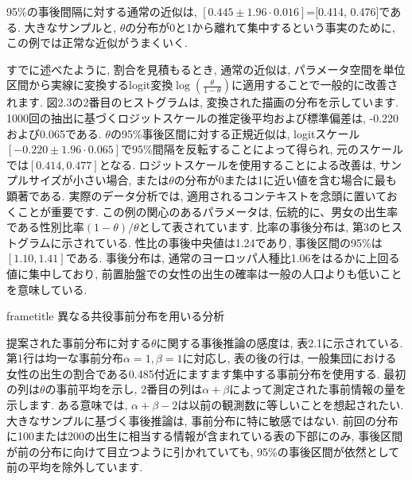 \documentclass[10pt,dvipdfmx,a4]{beamer}
\newcommand{\dbox}[1]{\begin{beamercolorbox}[wd=122mm, sep=0pt, shadow=false, rounded=false]{frametitle} { #1}\end{beamercolorbox}}
\begin{document}
\begin{frame}
95\%の事後間隔に対する通常の近似は, $[0.445\pm 1.96\cdot 0.016]$=[0.414, 0.476]である.
大きなサンプルと, $\theta$の分布が0と1から離れて集中するという事実のために, この例では正常な近似がうまくいく.

すでに述べたように, 割合を見積もるとき, 通常の近似は, パラメータ空間を単位区間から実線に変換するlogit変換$\log(\tfrac{\theta}{1-\theta})$に適用することで一般的に改善されます.
図2.3の2番目のヒストグラムは, 変換された描画の分布を示しています.
1000回の抽出に基づくロジットスケールの推定後平均および標準偏差は, -0.220および0.065である.
$\theta$の95\%事後区間に対する正規近似は, logitスケール$[-0.220\pm 1.96\cdot0.065]$で95\%間隔を反転することによって得られ, 元のスケールでは$[0.414,0.477]$となる.
ロジットスケールを使用することによる改善は, サンプルサイズが小さい場合, または$\theta$の分布が0または1に近い値を含む場合に最も顕著である.
実際のデータ分析では, 適用されるコンテキストを念頭に置いておくことが重要です.
この例の関心のあるパラメータは, 伝統的に、男女の出生率である性別比率$(1-\theta)/\theta$として表されています.
比率の事後分布は, 第3のヒストグラムに示されている.
性比の事後中央値は1.24であり, 事後区間の95\%は$[1.10,1.41]$である.
事後分布は, 通常のヨーロッパ人種比1.06をはるかに上回る値に集中しており, 前置胎盤での女性の出生の確率は一般の人口よりも低いことを意味している.
\end{frame}


\begin{frame}
\dbox{異なる共役事前分布を用いる分析}
提案された事前分布に対する$\theta$に関する事後推論の感度は, 表2.1に示されている.
第1行は均一な事前分布$\alpha= 1, \beta= 1$に対応し, 表の後の行は, 一般集団における女性の出生の割合である0.485付近にますます集中する事前分布を使用する.
最初の列は$\theta$の事前平均を示し, 2番目の列は$\alpha+\beta$によって測定された事前情報の量を示します.
ある意味では, $\alpha+\beta-2$は以前の観測数に等しいことを想起されたい.
大きなサンプルに基づく事後推論は, 事前分布に特に敏感ではない.
前回の分布に100または200の出生に相当する情報が含まれている表の下部にのみ, 事後区間が前の分布に向けて目立つように引かれていても, 95\%の事後区間が依然として前の平均を除外しています.
\end{frame}

\end{document}
